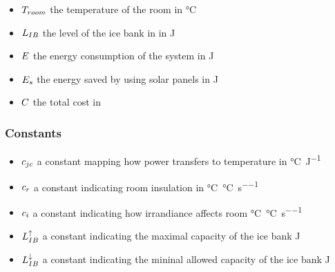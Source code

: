 \begin{itemize}
\item
  $T_{room}$ the temperature of the room in \si{\degreeCelsius}
\item
  $L_{IB}$ the level of the ice bank in in \si{\joule}
\item
  $E$ the energy consumption of the system in \si{\joule}
\item
  $E_{s}$ the energy saved by using solar panels in \si{\joule}
\item
  $C$ the total cost in \si{\dkk}
\end{itemize}

\subsubsection{Constants}
\begin{itemize}
\item $c_{jc}$ a constant mapping how power transfers to temperature
  in \si{\degreeCelsius\per\joule}
\item $c_{r}$ a constant indicating room insulation in
  \si{\degreeCelsius\per\degreeCelsius\per\second}
\item $c_{i}$ a constant indicating how irrandiance affects room 
  \si{\degreeCelsius\per\degreeCelsius\per\second}
\item $L^{\uparrow}_{IB}$ a constant indicating the maximal capacity of the ice bank
  \si{\joule}
\item $L^{\downarrow}_{IB}$ a constant indicating the mininal allowed capacity of
  the ice bank \si{\joule}
\end{itemize}


